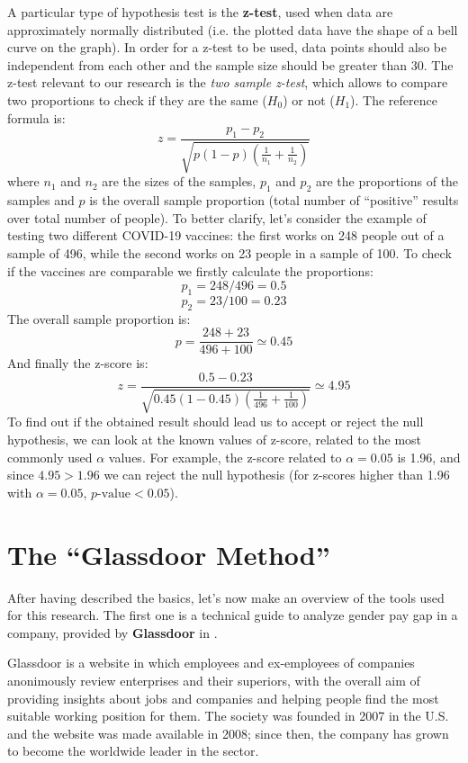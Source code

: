 A particular type of hypothesis test is the \textbf{z-test}, used when data are approximately normally distributed (i.e. the plotted data have the shape of a bell curve on the graph). In order for a z-test to be used, data points should also be independent from each other and the sample size should be greater than 30. The z-test relevant to our research is the \textit{two sample z-test}, which allows to compare two proportions to check if they are the same (\(H_0\)) or not (\(H_1\)). The reference formula is: \[z = \frac{p_1 - p_2}{\sqrt{p(1 - p)(\frac{1}{n_1} + \frac{1}{n_2})}}\] where \(n_1\) and \(n_2\) are the sizes of the samples, \(p_1\) and \(p_2\) are the proportions of the samples and \(p\) is the overall sample proportion (total number of ``positive'' results over total number of people). To better clarify, let's consider the example of testing two different COVID-19 vaccines: the first works on 248 people out of a sample of 496, while the second works on 23 people in a sample of 100. To check if the vaccines are comparable we firstly calculate the proportions: \[p_1 = 248 / 496 = 0.5\] \[p_2 = 23 / 100 = 0.23\]
The overall sample proportion is: \[p = \frac{248 + 23}{496 + 100} \simeq 0.45\]
And finally the z-score is: \[z = \frac{0.5 - 0.23}{\sqrt{0.45(1 - 0.45)(\frac{1}{496} + \frac{1}{100})}} \simeq 4.95\]
To find out if the obtained result should lead us to accept or reject the null hypothesis, we can look at the known values of z-score, related to the most commonly used \(\alpha\) values. For example, the z-score related to \(\alpha = 0.05\) is 1.96, and since \(4.95 > 1.96\) we can reject the null hypothesis (for z-scores higher than 1.96 with \(\alpha = 0.05\), \(p\textrm{-value} < 0.05\)).


\section{The ``Glassdoor Method''}
After having described the basics, let's now make an overview of the tools used for this research. The first one is a technical guide to analyze gender pay gap in a company, provided by \textbf{Glassdoor} in \cite{chamberlain2017analyze}.

Glassdoor is a website in which employees and ex-employees of companies anonimously review enterprises and their superiors, with the overall aim of providing insights about jobs and companies and helping people find the most suitable working position for them. The society was founded in 2007 in the U.S. and the website was made available in 2008; since then, the company has grown to become the worldwide leader in the sector.

